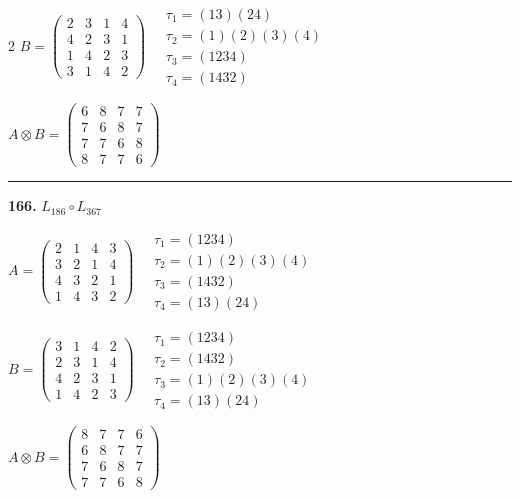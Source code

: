 \begin{multicols}{2}
$B = \begin{pmatrix} 2 & 3 & 1 & 4 \\ 4 & 2 & 3 & 1 \\ 1 & 4 & 2 & 3 \\ 3 & 1 & 4 & 2 \end{pmatrix} \quad \begin{matrix} \tau_{1}=(1 3)(2 4) \\ \tau_{2}=(1)(2)(3)(4) \\ \tau_{3}=(1 2 3 4) \\ \tau_{4}=(1 4 3 2) \end{matrix}$

$A \otimes B = \begin{pmatrix} 6 & 8 & 7 & 7 \\ 7 & 6 & 8 & 7 \\ 7 & 7 & 6 & 8 \\ 8 & 7 & 7 & 6 \end{pmatrix}$

\vspace{0.3em}
\hrule
\vspace{0.3em}

\noindent\textbf{166.} $L_{186} \circ L_{367}$

$A = \begin{pmatrix} 2 & 1 & 4 & 3 \\ 3 & 2 & 1 & 4 \\ 4 & 3 & 2 & 1 \\ 1 & 4 & 3 & 2 \end{pmatrix} \quad \begin{matrix} \tau_{1}=(1 2 3 4) \\ \tau_{2}=(1)(2)(3)(4) \\ \tau_{3}=(1 4 3 2) \\ \tau_{4}=(1 3)(2 4) \end{matrix}$

$B = \begin{pmatrix} 3 & 1 & 4 & 2 \\ 2 & 3 & 1 & 4 \\ 4 & 2 & 3 & 1 \\ 1 & 4 & 2 & 3 \end{pmatrix} \quad \begin{matrix} \tau_{1}=(1 2 3 4) \\ \tau_{2}=(1 4 3 2) \\ \tau_{3}=(1)(2)(3)(4) \\ \tau_{4}=(1 3)(2 4) \end{matrix}$

$A \otimes B = \begin{pmatrix} 8 & 7 & 7 & 6 \\ 6 & 8 & 7 & 7 \\ 7 & 6 & 8 & 7 \\ 7 & 7 & 6 & 8 \end{pmatrix}$


\end{multicols}
